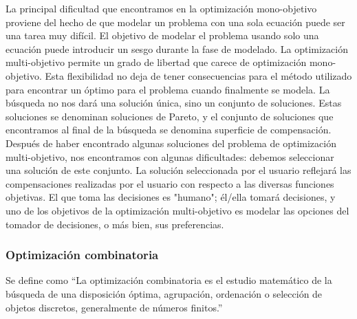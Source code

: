 La principal dificultad que encontramos en la optimización mono-objetivo proviene del hecho de que modelar un problema con una sola ecuación puede ser una tarea muy difícil. El objetivo de modelar el problema usando solo una ecuación puede introducir un sesgo durante la fase de modelado. La optimización multi-objetivo permite un grado de libertad que carece de optimización mono-objetivo. Esta flexibilidad no deja de tener consecuencias para el método utilizado para encontrar un óptimo para el problema cuando finalmente se modela. La búsqueda no nos dará una solución única, sino un conjunto de soluciones. Estas soluciones se denominan soluciones de Pareto, y el conjunto de soluciones que encontramos al final de la búsqueda se denomina superficie de compensación. Después de haber encontrado algunas soluciones del problema de optimización multi-objetivo, nos encontramos con algunas dificultades: debemos seleccionar una solución de este conjunto. La solución seleccionada por el usuario reflejará las compensaciones realizadas por el usuario con respecto a las diversas funciones objetivas. El que toma las decisiones es "humano"; él/ella tomará decisiones, y uno de los objetivos de la optimización multi-objetivo es modelar las opciones del tomador de decisiones, o más bien, sus preferencias. \cite{Collette2003MultiobjectiveStudies}
\subsubsection{Optimización combinatoria}
Se define como “La optimización combinatoria es el estudio matemático de la búsqueda de una disposición óptima, agrupación, ordenación o selección de objetos discretos, generalmente de números finitos.” \cite{Lawler1976CombinatorialMatroids}

